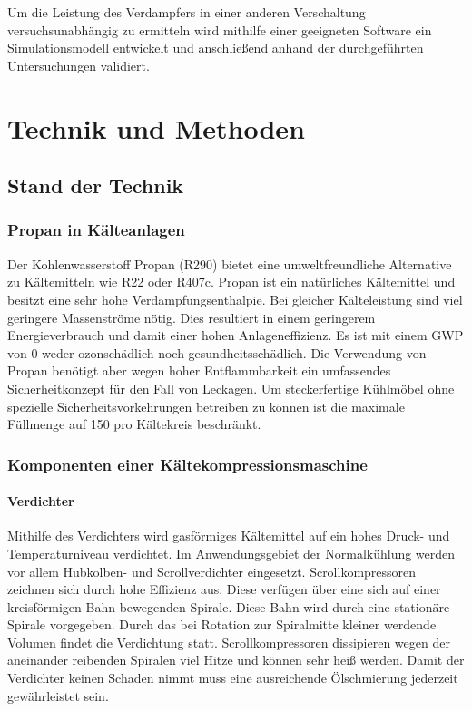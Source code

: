 Um die Leistung des Verdampfers in einer anderen Verschaltung versuchsunabhängig zu ermitteln wird mithilfe einer geeigneten Software ein Simulationsmodell entwickelt und anschließend anhand der durchgeführten Untersuchungen validiert.


\chapter{Technik und Methoden}
\label{cha:Technik}

\section{Stand der Technik}
\label{sec:Stand der Technik}

\subsection{Propan in Kälteanlagen}
\label{subsec:Propan in Kälteanlagen}

Der Kohlenwasserstoff Propan (R290) bietet eine umweltfreundliche Alternative zu Kältemitteln wie R22 oder R407c. Propan ist ein natürliches Kältemittel und besitzt eine sehr hohe Verdampfungsenthalpie. Bei gleicher Kälteleistung sind viel geringere Massenströme nötig. Dies resultiert in einem geringerem Energieverbrauch und damit einer hohen Anlageneffizienz.
Es ist mit einem GWP von 0 weder ozonschädlich noch gesundheitsschädlich. Die Verwendung von Propan benötigt aber wegen hoher Entflammbarkeit ein umfassendes Sicherheitkonzept für den Fall von Leckagen\cite{BitzerKuhlmaschinenGmbH.2014}\cite{Huber.2011}.
Um steckerfertige Kühlmöbel ohne spezielle Sicherheitsvorkehrungen betreiben zu können ist die maximale Füllmenge auf \unit{150}{\gram} pro Kältekreis beschränkt.



\subsection{Komponenten einer Kältekompressionsmaschine}
\label{subsec:Komponenten einer Kältekompressionsmaschine}

\subsubsection{Verdichter}
\label{subsubsec:Verdichter}

Mithilfe des Verdichters wird gasförmiges Kältemittel auf ein hohes Druck- und Temperaturniveau verdichtet. Im Anwendungsgebiet der Normalkühlung werden vor allem Hubkolben- und Scrollverdichter eingesetzt. Scrollkompressoren zeichnen sich durch hohe Effizienz aus. Diese verfügen über eine sich auf einer kreisförmigen Bahn bewegenden Spirale. Diese Bahn wird durch eine stationäre Spirale vorgegeben. Durch das bei Rotation zur Spiralmitte kleiner werdende Volumen findet die Verdichtung statt. Scrollkompressoren dissipieren wegen der aneinander reibenden Spiralen viel Hitze und können sehr heiß werden. Damit der Verdichter keinen Schaden nimmt muss eine ausreichende Ölschmierung jederzeit gewährleistet sein. 


